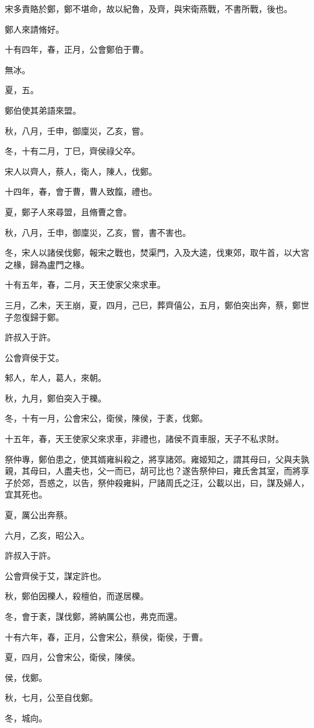 \begin{pinyinscope}
宋多責賂於鄭，鄭不堪命，故以紀魯，及齊，與宋衛燕戰，不書所戰，後也。

鄭人來請脩好。

十有四年，春，正月，公會鄭伯于曹。

無冰。

夏，五。

鄭伯使其弟語來盟。

秋，八月，壬申，御廩災，乙亥，嘗。

冬，十有二月，丁巳，齊侯祿父卒。

宋人以齊人，蔡人，衛人，陳人，伐鄭。

十四年，春，會于曹，曹人致餼，禮也。

夏，鄭子人來尋盟，且脩曹之會。

秋，八月，壬申，御廩災，乙亥，嘗，書不害也。

冬，宋人以諸侯伐鄭，報宋之戰也，焚渠門，入及大逵，伐東郊，取牛首，以大宮之椽，歸為盧門之椽。

十有五年，春，二月，天王使家父來求車。

三月，乙未，天王崩，夏，四月，己巳，葬齊僖公，五月，鄭伯突出奔，蔡，鄭世子忽復歸于鄭。

許叔入于許。

公會齊侯于艾。

邾人，牟人，葛人，來朝。

秋，九月，鄭伯突入于櫟。

冬，十有一月，公會宋公，衛侯，陳侯，于袲，伐鄭。

十五年，春，天王使家父來求車，非禮也，諸侯不貢車服，天子不私求財。

祭仲專，鄭伯患之，使其婿雍糾殺之，將享諸郊。雍姬知之，謂其母曰，父與夫孰親，其母曰，人盡夫也，父一而已，胡可比也？遂告祭仲曰，雍氏舍其室，而將享子於郊，吾惑之，以告，祭仲殺雍糾，尸諸周氏之汪，公載以出，曰，謀及婦人，宜其死也。

夏，厲公出奔蔡。

六月，乙亥，昭公入。

許叔入于許。

公會齊侯于艾，謀定許也。

秋，鄭伯因櫟人，殺檀伯，而遂居櫟。

冬，會于袲，謀伐鄭，將納厲公也，弗克而還。

十有六年，春，正月，公會宋公，蔡侯，衛侯，于曹。

夏，四月，公會宋公，衛侯，陳侯。

侯，伐鄭。

秋，七月，公至自伐鄭。

冬，城向。


\end{pinyinscope}
